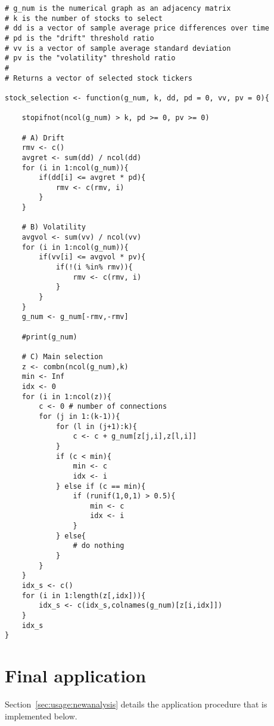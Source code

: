 {
\begin{lstlisting}
# g_num is the numerical graph as an adjacency matrix
# k is the number of stocks to select
# dd is a vector of sample average price differences over time
# pd is the "drift" threshold ratio
# vv is a vector of sample average standard deviation
# pv is the "volatility" threshold ratio
#
# Returns a vector of selected stock tickers

stock_selection <- function(g_num, k, dd, pd = 0, vv, pv = 0){

	stopifnot(ncol(g_num) > k, pd >= 0, pv >= 0)
	
	# A) Drift
	rmv <- c()
	avgret <- sum(dd) / ncol(dd)
	for (i in 1:ncol(g_num)){
		if(dd[i] <= avgret * pd){
			rmv <- c(rmv, i)
		}
	}
	
	# B) Volatility
	avgvol <- sum(vv) / ncol(vv)
	for (i in 1:ncol(g_num)){
		if(vv[i] <= avgvol * pv){
			if(!(i %in% rmv)){
				rmv <- c(rmv, i)
			}
		}
	}
	g_num <- g_num[-rmv,-rmv]
	
	#print(g_num)
	
	# C) Main selection
	z <- combn(ncol(g_num),k)
	min <- Inf
	idx <- 0 
	for (i in 1:ncol(z)){
		c <- 0 # number of connections
		for (j in 1:(k-1)){
			for (l in (j+1):k){
				c <- c + g_num[z[j,i],z[l,i]]
			}
			if (c < min){
				min <- c
				idx <- i
			} else if (c == min){
				if (runif(1,0,1) > 0.5){
					min <- c
					idx <- i
				}
			} else{
				# do nothing
			}
		}
	}
	idx_s <- c()
	for (i in 1:length(z[,idx])){
		idx_s <- c(idx_s,colnames(g_num)[z[i,idx]])
	}
	idx_s
}
\end{lstlisting}
}










\section{Final application}
\label{sec:appendicies:usage:newanalysis}

Section~\ref{sec:usage:newanalysis} details the application procedure that is 
implemented below.


